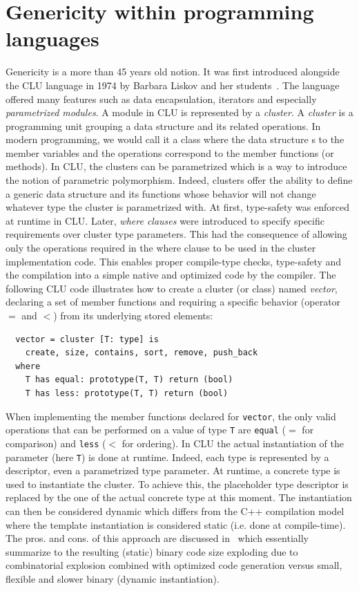 \section{Genericity within programming languages}
\label{sec:gen.genericity.within.programming.languages}

Genericity is a more than 45 years old notion. It was first introduced alongside the CLU language in 1974 by Barbara
Liskov and her students~\parencite{liskov.1993.cluart}. The language offered many features such as data encapsulation,
iterators and especially \emph{parametrized modules}. A module in CLU is represented by a \emph{cluster}. A
\emph{cluster} is a programming unit grouping a data structure and its related operations. In modern programming, we
would call it a class where the data structure s to the member variables and the operations correspond to the member
functions (or methods). In CLU, the clusters can be parametrized which is a way to introduce the notion of parametric
polymorphism. Indeed, clusters offer the ability to define a generic data structure and its functions whose behavior
will not change whatever type the cluster is parametrized with. At first, type-safety was enforced at runtime in CLU.
Later, \emph{where clauses} were introduced to specify specific requirements over cluster type parameters. This had the
consequence of allowing only the operations required in the where clause to be used in the cluster implementation code.
This enables proper compile-type checks, type-safety and the compilation into a simple native and optimized code by the
compiler. The following CLU code illustrates how to create a cluster (or class) named \emph{vector}, declaring a set of
member functions and requiring a specific behavior (operator \(=\) and \(<\)) from its underlying stored elements:

\begin{verbatim}
  vector = cluster [T: type] is
    create, size, contains, sort, remove, push_back
  where
    T has equal: prototype(T, T) return (bool)
    T has less: prototype(T, T) return (bool)
\end{verbatim}

When implementing the member functions declared for \texttt{vector}, the only valid operations that can be performed on
a value of type \texttt{T} are \texttt{equal} (\(=\) for comparison) and \texttt{less} (\(<\) for ordering). In CLU the
actual instantiation of the parameter (here \texttt{T}) is done at runtime. Indeed, each type is represented by a
descriptor, even a parametrized type parameter. At runtime, a concrete type is used to instantiate the cluster. To
achieve this, the placeholder type descriptor is replaced by the one of the actual concrete type at this moment. The
instantiation can then be considered dynamic which differs from the C++ compilation model where the template
instantiation is considered static (i.e. done at compile-time). The pros. and cons. of this approach are discussed
in~\parencite{atkinson.1978.cluimpl} which essentially summarize to the resulting (static) binary code size exploding
due to combinatorial explosion combined with optimized code generation versus small, flexible and slower binary (dynamic
instantiation).

